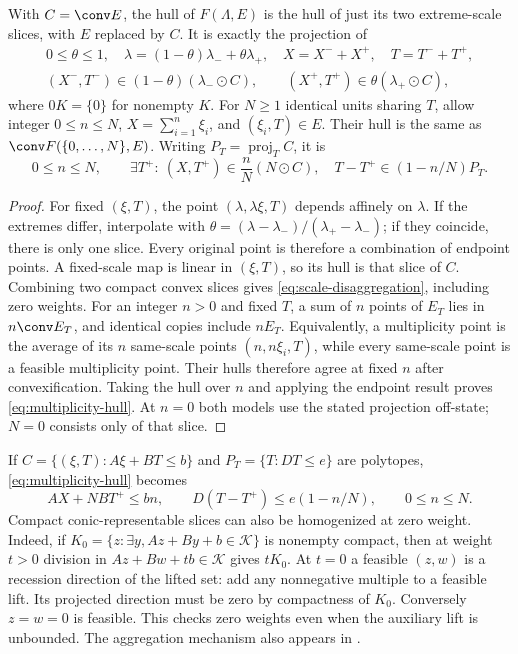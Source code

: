 \begin{proposition}\label{prop:scale-hull}
With $C=\conv E$, the hull of $F(\Lambda,E)$ is the hull of just its two
extreme-scale slices, with $E$ replaced by $C$. It is exactly the projection
of
\begin{equation}\label{eq:scale-disaggregation}
 \begin{gathered}
 0\le\theta\le1,\quad\lambda=(1-\theta)\lambda_-+\theta\lambda_+,
 \quad X=X^-+X^+,\quad T=T^-+T^+,\\
 (X^-,T^-)\in(1-\theta)(\lambda_-\odot C),\qquad
 (X^+,T^+)\in\theta(\lambda_+\odot C),
 \end{gathered}
\end{equation}
where $0K=\{0\}$ for nonempty $K$. For $N\ge1$ identical units sharing
$T$, allow integer $0\le n\le N$, $X=\sum_{i=1}^n\xi_i$, and
$(\xi_i,T)\in E$. Their hull is the same as $\conv F(\{0,\ldots,N\},E)$.
Writing $P_T=\operatorname{proj}_T C$, it is
\begin{equation}\label{eq:multiplicity-hull}
 0\le n\le N,\qquad
 \exists T^+:\ (X,T^+)\in\frac nN(N\odot C),\quad
 T-T^+\in(1-n/N)P_T.
\end{equation}
\end{proposition}
\begin{proof}
For fixed $(\xi,T)$, the point $(\lambda,\lambda\xi,T)$ depends affinely
on $\lambda$. If the extremes differ, interpolate with
$\theta=(\lambda-\lambda_-)/(\lambda_+-\lambda_-)$; if they coincide,
there is only one slice. Every original point is therefore a combination
of endpoint points. A fixed-scale map is linear in $(\xi,T)$, so its
hull is that slice of $C$. Combining two compact convex slices gives
\eqref{eq:scale-disaggregation}, including zero weights.
For an integer $n>0$ and fixed $T$, a sum of $n$ points of $E_T$ lies in
$n\conv E_T$, and identical copies include $n E_T$. Equivalently, a
multiplicity point is the average of its $n$ same-scale points
$(n,n\xi_i,T)$, while every same-scale point is a feasible multiplicity
point. Their hulls therefore agree at fixed $n$ after convexification.
Taking the hull over $n$ and applying the endpoint result proves
\eqref{eq:multiplicity-hull}. At $n=0$ both models use the stated
projection off-state; $N=0$ consists only of that slice.
\end{proof}
If $C=\{(\xi,T):A\xi+BT\le b\}$ and $P_T=\{T:DT\le e\}$ are
polytopes, \eqref{eq:multiplicity-hull} becomes
\[
 AX+NB T^+\le bn,\qquad D(T-T^+)\le e(1-n/N),\qquad0\le n\le N.
\]
Compact conic-representable slices can also be homogenized at zero weight.
Indeed, if $K_0=\{z:\exists y,Az+By+b\in\mathcal K\}$ is nonempty compact,
then at weight $t>0$ division in $Az+Bw+tb\in\mathcal K$ gives $tK_0$.
At $t=0$ a feasible $(z,w)$ is a recession direction of the lifted set:
add any nonnegative multiple to a feasible lift. Its projected direction
must be zero by compactness of $K_0$. Conversely $z=w=0$ is feasible.
This checks zero weights even when the auxiliary lift is unbounded.
The aggregation mechanism also appears in \citet[Section 4.1, Lemma 3
and Theorem 3, under Assumption 1]{WuEtAl2026}.

